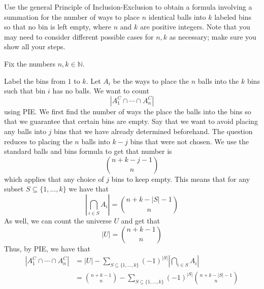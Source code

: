 \documentclass{eh-homework}
\begin{document}
    \begin{question}{1}
        Use the general Principle of Inclusion-Exclusion to obtain a formula involving a summation for the number of ways to place $n$ identical balls into $k$ labeled bins so that no bin is left empty, where $n$ and $k$ are positive integers. Note that you may need to consider different possible cases for $n, k$ as necessary; make sure you show all your steps.

        \tcblower

        Fix the numbers \(n,k \in \mathbb{N}\).

        Label the bins from \(1\) to \(k\). Let \(A_i\) be the ways to place the \(n\) balls into the \(k\) bins such that bin \(i\) has no balls. We want to count
        \[
            \left|A_1^C \cap \cdots \cap A_n^C\right|
        \]
        using PIE. We first find the number of ways the place the balls into the bins so that we guarantee that certain bins are empty. Say that we want to avoid placing any balls into \(j\) bins that we have already determined beforehand. The question reduces to placing the \(n\) balls into \(k-j\) bins that were not chosen. We use the standard balls and bins formula to get that number is
        \[
            \binom{n + k - j - 1}{n}
        \]
        which applies that any choice of \(j\) bins to keep empty. This means that for any subset \(S \subseteq \{ 1,..., k \}\) we have that
        \[
            \left\vert \bigcap_{i\in S} A_i \right\vert = \binom{n + k - |S| - 1}{n}
        \]
        As well, we can count the universe \(U\) and get that
        \[
            |U| = \binom{n + k - 1}{n}
        \]
        Thus, by PIE, we have that
        \begin{align*}
            \left|A_1^C \cap \cdots \cap A_n^C\right| &= |U| - \sum_{S \subseteq \{ 1, ..., k \}} (-1)^{|S|} \left\vert \bigcap_{i \in S} A_i \right\vert \\
            &= \binom{n + k - 1}{n} - \sum_{S \subseteq \{ 1, ..., k \}} (-1)^{|S|} \binom{n + k - |S| - 1}{n}
        \end{align*}
    \end{question}
\end{document}
